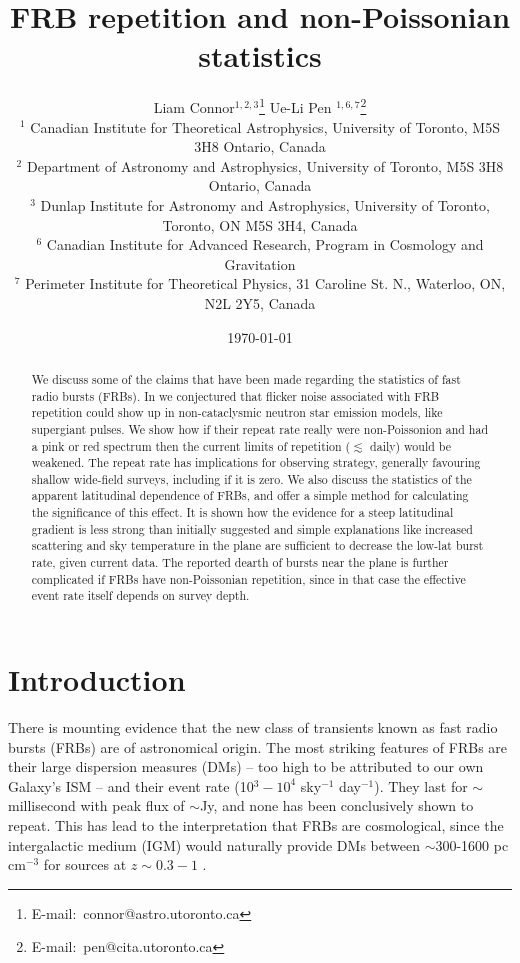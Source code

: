 \documentclass[useAMS,usenatbib]{mn2e}
\title{FRB repetition and non-Poissonian statistics}
\author[Connor et al.]{
Liam Connor$^{1,2,3}$\thanks{E-mail:\ connor@astro.utoronto.ca}
Ue-Li Pen $^{1, 6, 7}$\thanks{E-mail:\ pen@cita.utoronto.ca}
\\
$^1$ Canadian Institute for Theoretical Astrophysics, University of Toronto, M5S 3H8 Ontario, Canada
\\
$^2$ Department of Astronomy and Astrophysics, University of Toronto, 
M5S 3H8 Ontario, Canada
\\
$^3$ Dunlap Institute for Astronomy and Astrophysics, University of Toronto,
Toronto, ON M5S 3H4, Canada
\\
$^6$ Canadian Institute for Advanced Research, Program in Cosmology
and Gravitation
\\
$^7$ Perimeter Institute for Theoretical Physics, 31 Caroline St. N., Waterloo, ON, N2L 2Y5, Canada
}
\begin{document}
\date{\today}
\pagerange{\pageref{firstpage}--\pageref{lastpage}} 
\maketitle
\label{firstpage}

\begin{abstract}
We discuss some of the claims that have been made regarding the statistics of 
fast radio bursts (FRBs). In \cite{2015arXiv150505535C} we conjectured that flicker noise associated 
with FRB repetition could show up in non-cataclysmic neutron star emission models,
like supergiant pulses. We show how if their repeat rate really were non-Poissonion
and had a pink or red spectrum then the current limits of repetition ($\lesssim$ daily)
would be weakened. The repeat rate has implications for observing strategy, generally favouring 
shallow wide-field surveys, including if it is zero. 
We also discuss the statistics of the apparent latitudinal dependence of FRBs, and offer
a simple method for calculating the significance of this effect. It is shown how 
the evidence for a steep latitudinal gradient is less strong than initially suggested 
and simple explanations like increased scattering and sky temperature 
in the plane are sufficient to decrease the low-lat burst rate, given current data.
The reported dearth of bursts near the plane is further complicated if FRBs have 
non-Poissonian repetition, since in that case the effective event rate itself 
depends on survey depth.

\end{abstract}
\begin{keywords}
\end{keywords}

\newcommand{\be}{\begin{eqnarray}}
\newcommand{\ee}{\end{eqnarray}}
\newcommand{\beq}{\begin{equation}}
\newcommand{\eeq}{\end{equation}}

\section{Introduction}
There is mounting evidence that the new class of transients 
known as fast radio bursts (FRBs) are of astronomical origin.
The most striking features of FRBs are their large dispersion
measures (DMs) -- too high to be attributed to our own Galaxy's
ISM --
and their event rate (10$^3-10^4$ sky$^{-1}$ day$^{-1}$). They
last for $\sim$millisecond with peak flux of $\sim$Jy, and none
has been conclusively shown to repeat. This has lead to the 
interpretation that FRBs are cosmological,
since the intergalactic medium (IGM) would naturally provide
DMs between $\sim$300-1600 pc cm$^{-3}$ for sources at 
$z\sim0.3-1$ \citep{2013Sci...341...53T}. 
\end{document}
